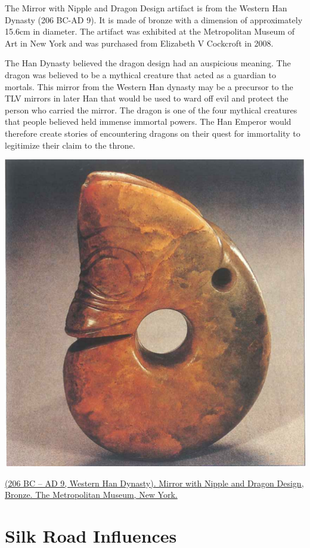 \documentclass[
]{book}
\begin{document}
The Mirror with Nipple and Dragon Design artifact is from the Western Han Dynasty (206 BC-AD 9). It is made of bronze with a dimension of approximately 15.6cm in diameter. The artifact was exhibited at the Metropolitan Museum of Art in New York and was purchased from Elizabeth V Cockcroft in 2008.

The Han Dynasty believed the dragon design had an auspicious meaning. The dragon was believed to be a mythical creature that acted as a guardian to mortals. This mirror from the Western Han dynasty may be a precursor to the TLV mirrors in later Han that would be used to ward off evil and protect the person who carried the mirror. The dragon is one of the four mythical creatures that people believed held immense immortal powers. The Han Emperor would therefore create stories of encountering dragons on their quest for immortality to legitimize their claim to the throne.

\includegraphics[width=1\textwidth,height=\textheight]{images/1. Jade_Pig_Dragon.png}

\href{https://www.metmuseum.org/art/collection/search/74429}{(206 BC -- AD 9, Western Han Dynasty). Mirror with Nipple and Dragon Design, Bronze. The Metropolitan Museum, New York.}

\hypertarget{tang}{%
\chapter*{Silk Road Influences}\label{tang}}
\end{document}
